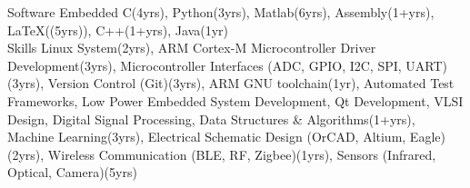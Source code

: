 

\begin{cvskills}


\cvskill
    {Software} %
    {Embedded C(4yrs), Python(3yrs), Matlab(6yrs), Assembly(1+yrs), 
    \LaTeX((5yrs)), C++(1+yrs), Java(1yr)}
\\
\cvskill
    {Skills} %
    {Linux System(2yrs), ARM Cortex-M Microcontroller Driver Development(3yrs), 
    Microcontroller Interfaces (ADC, GPIO, I2C, SPI, UART)(3yrs), Version Control (Git)(3yrs), 
    ARM GNU toolchain(1yr), Automated Test Frameworks, Low Power Embedded System Development, Qt Development,
    VLSI Design, Digital Signal Processing, Data Structures \& Algorithms(1+yrs),
    Machine Learning(3yrs),
    Electrical Schematic Design (OrCAD, Altium, Eagle)(2yrs),
    Wireless Communication (BLE, RF, Zigbee)(1yrs),
    Sensors (Infrared, Optical, Camera)(5yrs) }
\end{cvskills}
